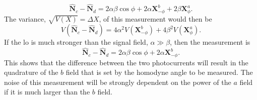 \begin{equation}
\mathbf{\hat{N}}_c - \mathbf{\hat{N}}_d = 2\alpha\beta\cos\phi + 2\alpha \mathbf{X}^b_{-\phi} + 2\beta \mathbf{X}^a_\phi.
\end{equation}
The variance, $\sqrt{V(X)} = \Delta X$, of this measurement would then be
\begin{equation}
V( \mathbf{\hat{N}}_c - \mathbf{\hat{N}}_d) = 4\alpha^2 V( \mathbf{X}^b_{-\phi}) + 4\beta^2 V( \mathbf{X}^a_{\phi}).
\label{eq:BHD_var}
\end{equation}
If the \gls{lo} is much stronger than the signal field, $\alpha \gg \beta$, then the measurement is
\begin{equation}
\mathbf{\hat{N}}_c - \mathbf{\hat{N}}_d = 2\alpha\beta\cos\phi + 2\alpha \mathbf{X}^b_{-\phi}.
\label{eq:bhd_signal}
\end{equation}
This shows that the difference between the two photocurrents will result in the quadrature of the $b$ field that is set by the homodyne angle to be measured. The noise of this measurement will be strongly dependent on the power of the $a$ field if it is much larger than the $b$ field.
